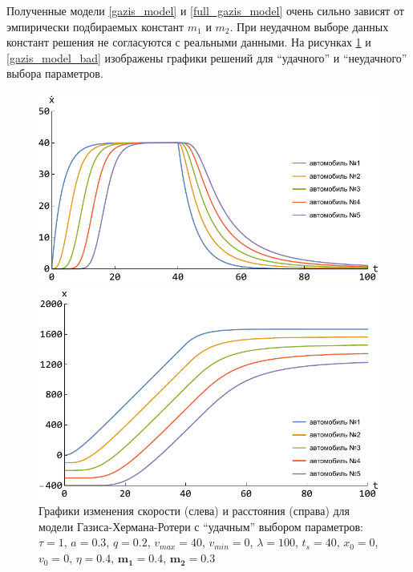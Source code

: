 \documentclass[12pt, a4paper]{extarticle}
\numberwithin{equation}{section}
\numberwithin{figure}{section}
\begin{document}
Полученные модели \eqref{gazis_model} и \eqref{full_gazis_model} очень сильно зависят от эмпирически подбираемых констант $m_1$ и $m_2$. При неудачном выборе данных констант решения не согласуются с реальными данными. На рисунках \ref{gazis_model_good} и \ref{gazis_model_bad} изображены графики решений для ``удачного'' и ``неудачного'' выбора параметров. 
\begin{figure}[h!]
	\begin{center}
		\begin{minipage}[h!]{0.48\linewidth}
			\includegraphics[width=1\linewidth,height=0.2\textheight]
			{Images/gazis_model_good_speed.pdf}
		\end{minipage}
		\hfill 
		\begin{minipage}[h!]{0.48\linewidth}
			\includegraphics[width=1\linewidth,height=0.2\textheight]
			{Images/gazis_model_good_distance.pdf}
		\end{minipage}
		\caption{Графики изменения скорости (слева) и расстояния (справа) для модели Газиса-Хермана-Ротери с ``удачным'' выбором параметров: $\tau=1$, $a=0.3$, $q=0.2$, $v_{max}=40$, $v_{min}=0$, $\lambda=100$, $t_s=40$, $x_0=0$, $v_0=0$, $\eta=0.4$, $\boldsymbol{m_1=0.4}$, $\boldsymbol{m_2=0.3}$}
		\label{gazis_model_good}
	\end{center}
\end{figure}
\end{document}
